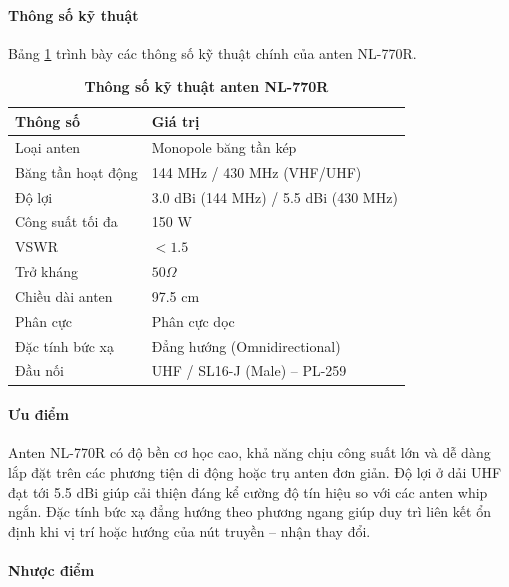 \documentclass{article}
\begin{document}
	\paragraph{Thông số kỹ thuật}\mbox{}
	
	Bảng \ref{tab_nl770r} trình bày các thông số kỹ thuật chính của anten NL-770R.
	
	\begin{table}[H]
		\caption[Thông số kỹ thuật anten NL-770R]{\bfseries \fontsize{12pt}{0pt}\selectfont Thông số kỹ thuật anten NL-770R}
		\label{tab_nl770r}
		\centering
		\begin{tabular}{|p{4cm}|p{9cm}|}
			\hline
			\textbf{Thông số} & \textbf{Giá trị} \\ 
			\hline
			Loại anten & Monopole băng tần kép \\ 
			\hline
			Băng tần hoạt động & 144 MHz / 430 MHz (VHF/UHF) \\ 
			\hline
			Độ lợi & 3.0 dBi (144 MHz) / 5.5 dBi (430 MHz) \\ 
			\hline
			Công suất tối đa & 150 W \\ 
			\hline
			VSWR & $< 1.5$ \\ 
			\hline
			Trở kháng & $50\Omega$ \\ 
			\hline
			Chiều dài anten & 97.5 cm \\ 
			\hline
			Phân cực & Phân cực dọc \\ 
			\hline
			Đặc tính bức xạ & Đẳng hướng (Omnidirectional) \\ 
			\hline
			Đầu nối & UHF / SL16-J (Male) – PL-259 \\ 
			\hline
		\end{tabular}
	\end{table}
	
	\paragraph{Ưu điểm}\mbox{}
	
	Anten NL-770R có độ bền cơ học cao, khả năng chịu công suất lớn và dễ dàng lắp đặt trên các phương tiện di động hoặc trụ anten đơn giản. Độ lợi ở dải UHF đạt tới 5.5 dBi giúp cải thiện đáng kể cường độ tín hiệu so với các anten whip ngắn. Đặc tính bức xạ đẳng hướng theo phương ngang giúp duy trì liên kết ổn định khi vị trí hoặc hướng của nút truyền – nhận thay đổi.
	
	\paragraph{Nhược điểm}\mbox{}
	
\end{document}
